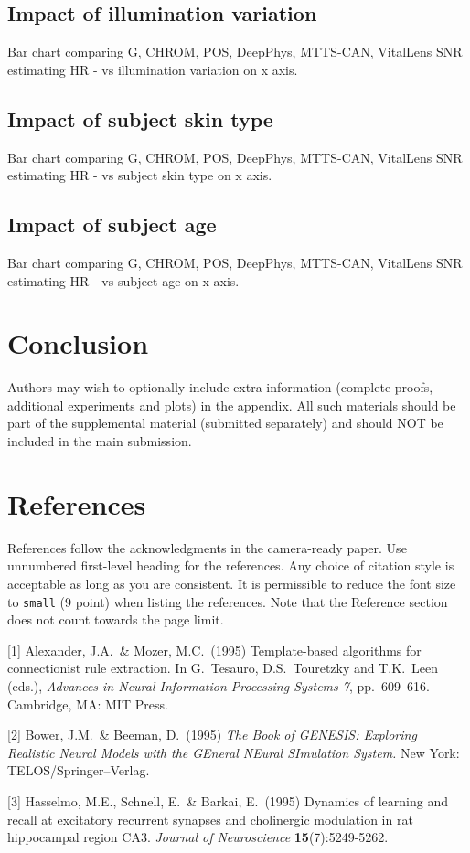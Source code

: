 \documentclass{article}
\begin{document}
\subsection{Impact of illumination variation}

Bar chart comparing G, CHROM, POS, DeepPhys, MTTS-CAN, VitalLens SNR estimating HR - vs illumination variation on x axis.

\subsection{Impact of subject skin type}

Bar chart comparing G, CHROM, POS, DeepPhys, MTTS-CAN, VitalLens SNR estimating HR - vs subject skin type on x axis.

\subsection{Impact of subject age}

Bar chart comparing G, CHROM, POS, DeepPhys, MTTS-CAN, VitalLens SNR estimating HR - vs subject age on x axis.

\section{Conclusion}

Authors may wish to optionally include extra information (complete proofs, additional experiments and plots) in the appendix. All such materials should be part of the supplemental material (submitted separately) and should NOT be included in the main submission.


\section*{References}


References follow the acknowledgments in the camera-ready paper. Use unnumbered first-level heading for
the references. Any choice of citation style is acceptable as long as you are
consistent. It is permissible to reduce the font size to \verb+small+ (9 point)
when listing the references.
Note that the Reference section does not count towards the page limit.
\medskip


{
\small


[1] Alexander, J.A.\ \& Mozer, M.C.\ (1995) Template-based algorithms for
connectionist rule extraction. In G.\ Tesauro, D.S.\ Touretzky and T.K.\ Leen
(eds.), {\it Advances in Neural Information Processing Systems 7},
pp.\ 609--616. Cambridge, MA: MIT Press.


[2] Bower, J.M.\ \& Beeman, D.\ (1995) {\it The Book of GENESIS: Exploring
  Realistic Neural Models with the GEneral NEural SImulation System.}  New York:
TELOS/Springer--Verlag.


[3] Hasselmo, M.E., Schnell, E.\ \& Barkai, E.\ (1995) Dynamics of learning and
recall at excitatory recurrent synapses and cholinergic modulation in rat
hippocampal region CA3. {\it Journal of Neuroscience} {\bf 15}(7):5249-5262.
}

\end{document}
